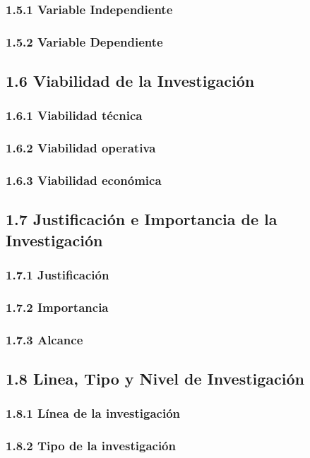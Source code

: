 \documentclass[stu, 12pt, letterpaper, donotrepeattitle, floatsintext, natbib]{apa7}
\begin{document}
\subsubsection{1.5.1 Variable Independiente}
\subsubsection{1.5.2 Variable Dependiente}

\subsection{1.6 Viabilidad de la Investigación}
\subsubsection{1.6.1 Viabilidad técnica}
\subsubsection{1.6.2 Viabilidad operativa}
\subsubsection{1.6.3 Viabilidad económica}

\subsection{1.7 Justificación e Importancia de la Investigación} 
\subsubsection{1.7.1 Justificación}
\subsubsection{1.7.2 Importancia}
\subsubsection{1.7.3 Alcance}

\subsection{1.8 Linea, Tipo y Nivel de Investigación}
\subsubsection{1.8.1 Línea de la investigación}
\subsubsection{1.8.2 Tipo de la investigación}
\end{document}
